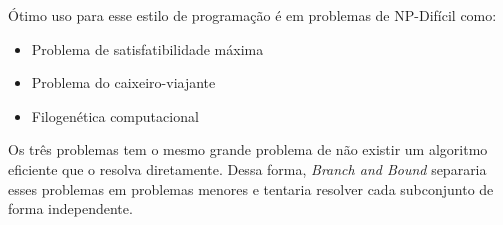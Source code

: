 Ótimo uso para esse estilo de programação é em problemas de
NP-Difícil \cite{NPDificil} como:

\begin{itemize}
    \item Problema de satisfatibilidade máxima
    \item Problema do caixeiro-viajante
    \item Filogenética computacional
\end{itemize}

Os três problemas tem o mesmo grande problema de não existir
um algoritmo eficiente que o resolva diretamente. Dessa forma,
\emph{Branch and Bound} separaria esses problemas em problemas 
menores e tentaria resolver cada subconjunto de forma independente.
